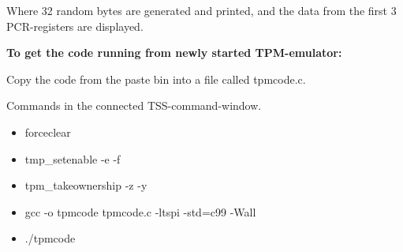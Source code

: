 \documentclass[10pt]{article}
\begin{document}
Where 32 random bytes are generated and printed, and the data from the first 3 PCR-registers
are displayed.

\textbf{To get the code running from newly started TPM-emulator:}

Copy the code from the paste bin into a file called tpmcode.c.

Commands in the connected TSS-command-window.
\begin{itemize}
  \item{forceclear}
  \item{tmp\_setenable -e -f}
  \item{tpm\_takeownership -z -y}
  \item{gcc -o tpmcode tpmcode.c -ltspi -std=c99 -Wall}
  \item{./tpmcode}
\end{itemize}
\end{document}
